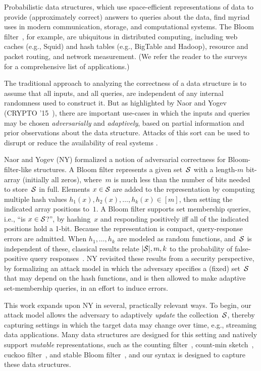 Probabilistic data structures, which use space-efficient
representations of data to provide (approximately correct) answers to
queries about the data, find myriad uses in modern communication,
storage, and computational systems.  The Bloom
filter~\cite{bloom1970space}, for example, are
ubiquitous in distributed computing, including web caches (e.g., Squid) and hash
tables (e.g., BigTable and Hadoop), resource and packet routing, and network
measurement. (We refer the reader to the
surveys~\cite{broder2004network,tarkoma2012theory} for a comprehensive list of
applications.) 

The traditional approach to analyzing the correctness of a data structure is to
assume that all inputs, and all queries, are independent of any internal
randomness used to construct it.  But as highlighted by Naor and
Yogev (CRYPTO '15~\cite{naor2015bloom}), there are important use-cases in which the inputs
and queries may be chosen \emph{adversarially} and \emph{adaptively}, based on
partial information and prior observations about the data structure. Attacks of
this sort can be used to disrupt or reduce the availability of real systems
\cite{crosby2003denial,gerbet2015power,lipton1993clocked}.

Naor and Yogev (NY) formalized a notion of adversarial correctness for
Bloom-filter-like structures. A Bloom filter represents a given
set~$\mathcal{S}$ with a length-$m$ bit-array (initially all zeros),
where~$m$ is much less than the number of bits needed to store~$\mathcal{S}$
in full.  Elements $x \in \mathcal{S}$ are added to the representation by
computing multiple hash values $h_1(x),h_2(x),\ldots,h_k(x)\in [m]$, then setting the
indicated array positions to~$1$.  A Bloom filter supports set membership
queries, i.e., ``is $x\in\mathcal{S}$?'', by hashing~$x$ and responding positively iff
all of the indicated positions hold a 1-bit.  Because the
representation is compact, query-response errors are admitted.
When $h_1,\ldots,h_k$ are modeled
as random functions, and~$\mathcal{S}$ is independent of these, classical results
relate $|\mathcal{S}|,m,k$ to the probability of false-positive query
responses~\cite{broder2004network,kirsch2006less}.
%
NY revisited these results from a security perspective, by
formalizing an attack model in which the adversary specifies a
(fixed) set~$\mathcal{S}$ that may
depend on the hash functions, and is then allowed to make adaptive
set-membership queries, in an effort to induce errors.

This work expands upon NY in several, practically relevant ways.  To begin, our
attack model allows the adversary to adaptively \emph{update} the
collection~$\mathcal{S}$, thereby capturing settings in which the target data may
change over time, e.g., streaming data applications. Many data structures are
designed for this setting and natively support \emph{mutable} representations,
such as the counting filter~\cite{fan2000summary}, count-min
sketch~\cite{cormode2005improved}, cuckoo filter~\cite{fan2014cuckoo}, and
stable Bloom filter~\cite{deng2006approximately}, and our syntax is designed to
capture these data structures.

